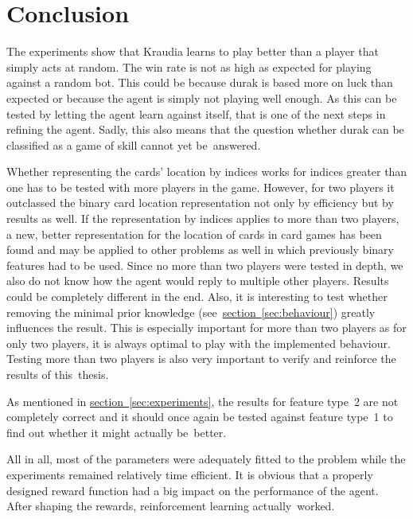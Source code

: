 \documentclass[a4paper,titlepage]{article}
\begin{document}
\newpage

\section{Conclusion}

The experiments show that Kraudia learns to play better than a player that simply acts at random. The win rate is not as high as expected for playing against a random bot. This could be because durak is based more on luck than expected or because the agent is simply not playing well enough. As this can be tested by letting the agent learn against itself, that is one of the next steps in refining the agent. Sadly, this also means that the question whether durak can be classified as a game of skill cannot yet be~answered.

Whether representing the cards' location by indices works for indices greater than one has to be tested with more players in the game. However, for two players it outclassed the binary card location representation not only by efficiency but by results as well. If the representation by indices applies to more than two players, a new, better representation for the location of cards in card games has been found and may be applied to other problems as well in which previously binary features had to be used. Since no more than two players were tested in depth, we also do not know how the agent would reply to multiple other players. Results could be completely different in the end. Also, it is interesting to test whether removing the minimal prior knowledge (see~\hyperref[sec:behaviour]{section~\ref*{sec:behaviour}}) greatly influences the result. This is especially important for more than two players as for only two players, it is always optimal to play with the implemented behaviour. Testing more than two players is also very important to verify and reinforce the results of this~thesis.

As mentioned in \hyperref[sec:experiments]{section~\ref*{sec:experiments}}, the results for feature type~2 are not completely correct and it should once again be tested against feature type~1 to find out whether it might actually be~better.

All in all, most of the parameters were adequately fitted to the problem while the experiments remained relatively time efficient. It is obvious that a properly designed reward function had a big impact on the performance of the agent. After shaping the rewards, reinforcement learning actually~worked.
\end{document}
